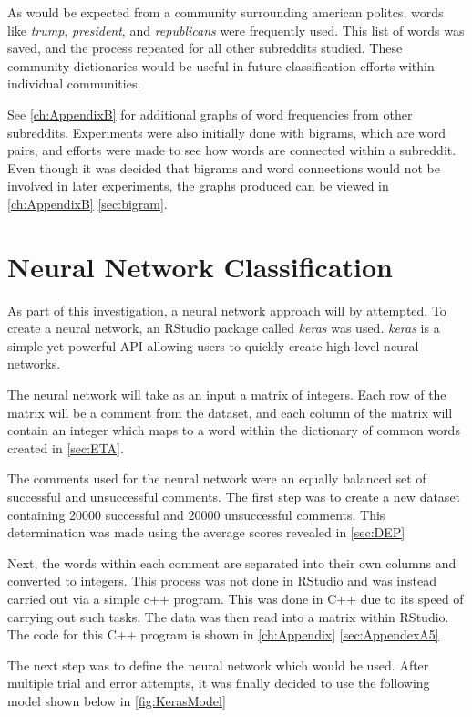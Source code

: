 As would be expected from a community surrounding american politcs, words like \textit{trump}, \textit{president}, and \textit{republicans} were frequently used. This list of words was saved, and the process repeated for all other subreddits studied. These community dictionaries would be useful in future classification efforts within individual communities.

See \autoref{ch:AppendixB} for additional graphs of word frequencies from other subreddits. Experiments were also initially done with bigrams, which are word pairs, and efforts were made to see how words are connected within a subreddit. Even though it was decided that bigrams and word connections would not be involved in later experiments, the graphs produced can be viewed in \autoref{ch:AppendixB} \autoref{sec:bigram}.


\section {Neural Network Classification}
\label{sec:neuralnet}
As part of this investigation, a neural network approach will by attempted. To create a neural network, an RStudio package called \textit{keras} was used. \textit{keras} is a simple yet powerful API allowing users to quickly create high-level neural networks. \cite{17} 

The neural network will take as an input a matrix of integers. Each row of the matrix will be a comment from the dataset, and each column of the matrix will contain an integer which maps to a word within the dictionary of common words created in \autoref{sec:ETA}.

The comments used for the neural network were an equally balanced set of successful and unsuccessful comments. The first step was to create a new dataset containing 20000 successful and 20000 unsuccessful comments. This determination was made using the average scores revealed in \autoref{sec:DEP}

Next, the words within each comment are separated into their own columns and converted to integers. This process was not done in RStudio and was instead carried out via a simple c++ program. This was done in C++ due to its speed of carrying out such tasks. The data was then read into a matrix within RStudio. The code for this C++ program is shown in \autoref{ch:Appendix} \autoref{sec:AppendexA5}

The next step was to define the neural network which would be used. After multiple trial and error attempts, it was finally decided to use the following model shown below in \autoref{fig:KerasModel}

